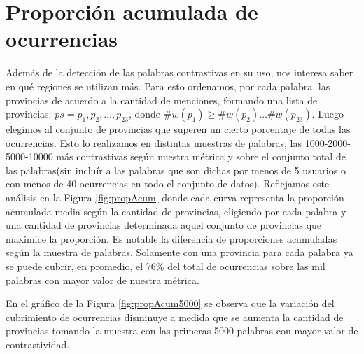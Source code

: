 \section{Proporción acumulada de ocurrencias} %
\label{sec:proporcionDeOcurrencias}
Además de la detección de las palabras contrastivas en su uso, nos interesa saber en qué regiones se utilizan más. Para esto ordenamos, por cada palabra, las provincias de acuerdo a la cantidad de menciones, formando una lista de provincias: $ps = p_1,p_2,\ldots,p_{23}$, 
donde $\#w(p_1) \geq \#w(p_2) \ldots \#w(p_{23})$. Luego elegimos al conjunto de provincias que superen un cierto porcentaje de todas las ocurrencias.
Esto lo realizamos en distintas muestras de palabras, las 1000-2000-5000-10000 más contrastivas según nuestra métrica y sobre el conjunto total de las palabras(sin incluír a las palabras que son dichas por menos de 5 usuarios o con menos de 40 ocurrencias en todo el conjunto de datos). Reflejamos este análisis en la Figura \ref{fig:propAcum} donde cada curva representa la proporción acumulada media según la cantidad de provincias, eligiendo por cada palabra y una cantidad de provincias determinada aquel conjunto de provincias que maximice la proporción. Es notable la diferencia de proporciones acumuladas según la muestra de palabras. Solamente con una provincia para cada palabra ya se puede cubrir, en promedio, el 76\% del total de ocurrencias sobre las mil palabras con mayor valor de nuestra métrica.

En el gráfico de la Figura \ref{fig:propAcum5000} se observa que la variación del cubrimiento de ocurrencias disminuye a medida que se aumenta la cantidad de provincias tomando la muestra con las primeras 5000 palabras con mayor valor de contrastividad. 


